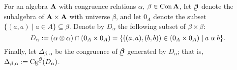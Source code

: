 

For an algebra $\mathbf{A}$ with congruence relations $\alpha$, $\beta\in \operatorname{Con}\mathbf{A}$,
let $\bbeta$ denote the subalgebra of $\mathbf{A}\times \mathbf{A}$ with universe 
$\beta$, and let $0_A$ denote the subset $\{(a,a) \mid a\in A\} \subseteq \beta$.
Denote by $D_\alpha$ the following subset of $\beta \times \beta$:
\[
D_\alpha :=(\alpha \otimes \alpha) \cap (0_A \times 0_A)
= \{((a,a), (b,b)) \in (0_A \times 0_A) \mid a\mathrel{\alpha} b\}.
\]
Finally, let $\Delta_{\beta, \alpha}$ be the congruence of $\bbeta$ generated by
$D_\alpha$; that is, $\Delta_{\beta, \alpha} := \Cg^{\bbeta}(D_\alpha)$.

\renewcommand{\downbeta}{\ensuremath{\lb 0_A, \beta\rb}}

